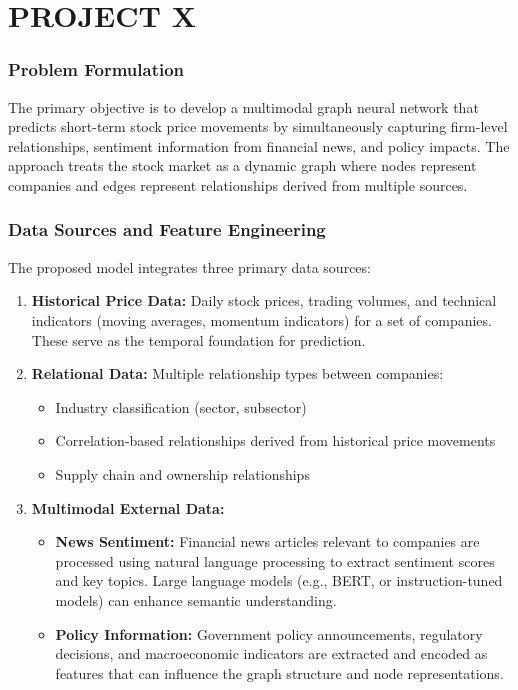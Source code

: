 \chapter{PROJECT X}

\subsection{Problem Formulation}

The primary objective is to develop a multimodal graph neural network that predicts short-term stock price movements by simultaneously capturing firm-level relationships, sentiment information from financial news, and policy impacts. The approach treats the stock market as a dynamic graph where nodes represent companies and edges represent relationships derived from multiple sources.

\subsection{Data Sources and Feature Engineering}

The proposed model integrates three primary data sources:

\begin{enumerate}
    \item \textbf{Historical Price Data:} Daily stock prices, trading volumes, and technical indicators (moving averages, momentum indicators) for a set of companies. These serve as the temporal foundation for prediction.
    
    \item \textbf{Relational Data:} Multiple relationship types between companies:
    \begin{itemize}
        \item Industry classification (sector, subsector)
        \item Correlation-based relationships derived from historical price movements
        \item Supply chain and ownership relationships
    \end{itemize}
    
    \item \textbf{Multimodal External Data:}
    \begin{itemize}
        \item \textbf{News Sentiment:} Financial news articles relevant to companies are processed using natural language processing to extract sentiment scores and key topics. Large language models (e.g., BERT, or instruction-tuned models) can enhance semantic understanding.
        \item \textbf{Policy Information:} Government policy announcements, regulatory decisions, and macroeconomic indicators are extracted and encoded as features that can influence the graph structure and node representations.
    \end{itemize}
\end{enumerate}

